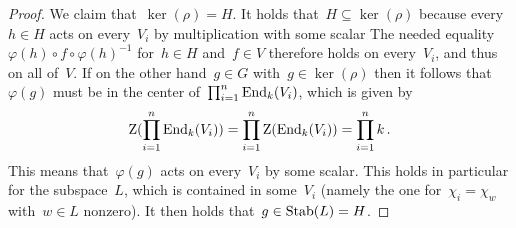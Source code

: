 \begin{proof}
  We claim that~$\ker(\rho) = H$.
  It holds that~$H \subseteq \ker(\rho)$ because every~$h \in H$ acts on every~$V_i$ by multiplication with some scalar
  The needed equality~$\varphi(h) \circ f \circ \varphi(h)^{-1}$ for~$h \in H$ and~$f \in V$ therefore holds on every~$V_i$, and thus on all of~$V$.
  If on the other hand~$g \in G$ with~$g \in \ker(\rho)$ then it follows that~$\varphi(g)$ must be in the center of~$\prod_{i=1}^n \operatorname{End}_k(V_i)$, which is given by
  \[
      \operatorname{Z}(\prod_{i=1}^n \operatorname{End}_k(V_i))
    = \prod_{i=1}^n \operatorname{Z}(\operatorname{End}_k(V_i))
    = \prod_{i=1}^n k \,.
  \]
  This means that~$\varphi(g)$ acts on every~$V_i$ by some scalar.
  This holds in particular for the  subspace~$L$, which is contained in some~$V_i$ (namely the one for~$\chi_i = \chi_w$ with~$w \in L$ nonzero).
  It then holds that~$g \in \operatorname{Stab}(L) = H$.
\end{proof}




